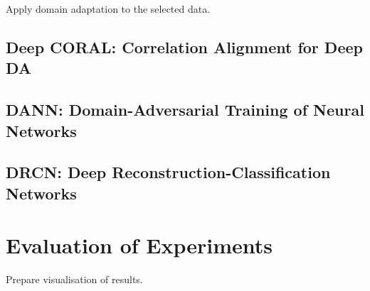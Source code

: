 Apply domain adaptation to the selected data.

\subsection{Deep CORAL: Correlation Alignment for Deep DA}

\subsection{DANN: Domain-Adversarial Training of Neural Networks}

\subsection{DRCN: Deep Reconstruction-Classification Networks}

\section{Evaluation of Experiments}

Prepare visualisation of results.
